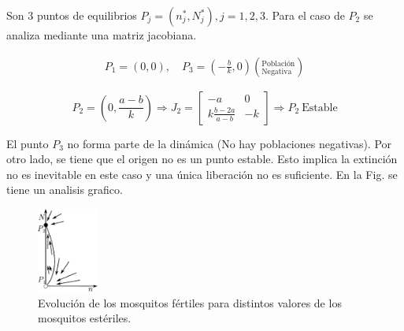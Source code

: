 \documentclass[twocolumn,aps,prl]{revtex4-1}
\newcommand{\nstar}{n^*}
\newcommand{\Nstar}{N^*}
\begin{document}
Son 3 puntos de equilibrios $P_j = (\nstar_{j},\Nstar_{j}), j= 1, 2, 3$. Para el caso de $P_2$ se analiza mediante una matriz jacobiana.



$$
\begin{aligned}
    P_1 = (0, 0), \quad P_3 = \left(- \frac{b}{k}, 0 \right) \left(^\text{Población}_\text{Negativa} \right)
\end{aligned}
$$



$$
P_2 = \left( 0, \frac{a-b}{k} \right)  \Rightarrow  
J_2 = 
\begin{bmatrix}
    -a & 0  \\
    k \frac{b - 2a}{ a - b } & -k 
\end{bmatrix}
\Rightarrow  P_2 \ \text{Estable}
$$

El punto $P_3$ no forma parte de la dinámica (No hay poblaciones negativas). Por otro lado, se tiene que el origen no es un punto estable. Esto implica la extinción no es inevitable en este caso y una única liberación no es suficiente. En la Fig. se tiene un analisis grafico.

\begin{figure}[!ht]
    \centering  
    \includegraphics[width=0.18\textwidth]{figuras/cosa.pdf}
    \caption{Evolución de los mosquitos fértiles para distintos valores de los mosquitos estériles.}
    \label{fig:cosa}
\end{figure}
\end{document}
